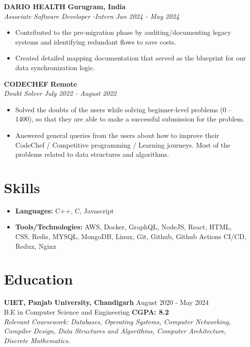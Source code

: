 \documentclass[10pt, letterpaper]{article}
\newcommand{\resumeEntry}[4]{
  \noindent\textbf{#1} \hfill \textbf{#2} \\
  \textit{#3} \hfill \textit{#4}
}
\begin{document}
\resumeEntry{DARIO HEALTH}{Gurugram, India}{Associate Software Developer -Intern}{Jan 2024 - May 2024}
\begin{itemize}[leftmargin=0.2in, nosep, topsep=2pt]
    \item Contributed to the pre-migration phase by auditing/documenting legacy systems and identifying redundant flows to save costs.
    \item Created detailed mapping documentation that served as the blueprint for our data synchronization logic.
\end{itemize}
\vspace{2pt}


\resumeEntry{CODECHEF}{Remote}{Doubt Solver}{July 2022 - August 2022}
\begin{itemize}[leftmargin=0.2in, nosep, topsep=2pt]
    \item Solved the doubts of the users while solving beginner-level problems (0 – 1400), so that they are able to make a successful submission for the problem.
    \item Answered general queries from the users about how to improve their CodeChef / Competitive programming / Learning journeys. Most of the problems related to data structures and algorithms.
\end{itemize}
\vspace{5pt}


\section{Skills}
\begin{itemize}[leftmargin=0.0in, label={}, nosep]
    \item \textbf{Languages:} C++, C, Javascript
    \item \textbf{Tools/Technologies:} AWS, Docker, GraphQL, NodeJS, React, HTML, CSS, Redis, MYSQL, MongoDB, Linux, Git, Github, Github Actions CI/CD, Redux, Nginx 
\end{itemize}

\section{Education}
\noindent
\textbf{UIET, Panjab University, Chandigarh} \hfill August 2020 - May 2024 \\
B.E in Computer Science and Engineering \hfill \textbf{CGPA: 8.2} \\
{\small \textit{Relevant Coursework: Databases, Operating Systems, Computer Networking, Compiler Design, Data Structures and Algorithms, Computer Architecture, Discrete Mathematics.}}
\end{document}
